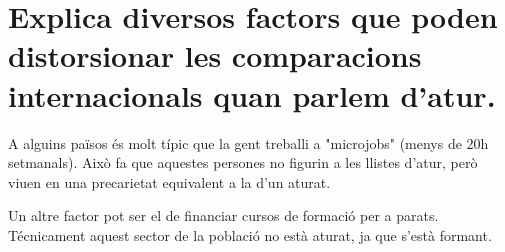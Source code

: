 \section{
  Explica diversos factors que poden distorsionar les comparacions
  internacionals quan parlem d’atur.
}

A alguins països és molt típic que la gent treballi a "microjobs" 
(menys de 20h setmanals). Això fa que aquestes persones no figurin
a les llistes d'atur, però viuen en una precarietat equivalent a la
d'un aturat.

Un altre factor pot ser el de financiar cursos de formació per a parats.
Técnicament aquest sector de la població no està aturat, ja que s'està 
formant.

